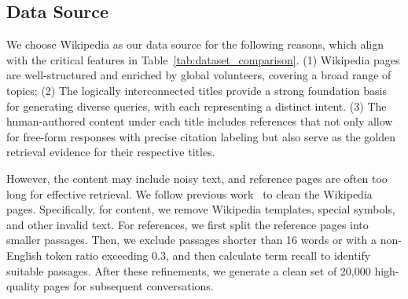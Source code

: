 \documentclass[11pt]{article}
\begin{document}
\subsection{Data Source}
\label{sec:data_source}
We choose Wikipedia as our data source for the following reasons, which align with the critical features in Table~\ref{tab:dataset_comparison}.
(1) Wikipedia pages are well-structured and enriched by global volunteers, covering a broad range of topics;
(2) The logically interconnected titles provide a strong foundation basis for generating diverse queries, with each representing a distinct intent.
(3) The human-authored content under each title includes references that not only allow for free-form responses with precise citation labeling but also serve as the golden retrieval evidence for their respective titles.




However, the content may include noisy text, and reference pages are often too long for effective retrieval. 
We follow previous work~\cite{qian_webbrain} to clean the Wikipedia pages. Specifically,
for content, we remove Wikipedia templates, special symbols, and other invalid text. 
For references, we first split the reference pages into smaller passages. Then, we exclude passages shorter than 16 words or with a non-English token ratio exceeding 0.3, and then calculate term recall to identify suitable passages. After these refinements, we generate a clean set of 20,000 high-quality pages for subsequent conversations.

\end{document}
